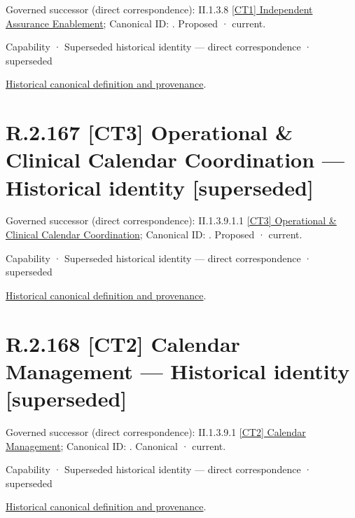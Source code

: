 {\small Governed successor (direct correspondence): II.1.3.8 \hyperref[element:616682b612d244429e656b040e002d56]{[CT1] Independent Assurance Enablement}; Canonical ID: \texttt{}. Proposed · current.}\par
\label{element:88bf57b7a92c4c1da1b5f0a67d3ebd82}
{\small Capability · Superseded historical identity — direct correspondence · superseded}\par
\href{../../../../../../../continuum/strategy/capability/88bf57b7a92c4c1da1b5f0a67d3ebd82.md}{Historical canonical definition and provenance}.\par
\section*{R.2.167 [CT3] Operational \& Clinical Calendar Coordination — Historical identity [superseded]}
\label{navigation:R.2.167}

{\small Governed successor (direct correspondence): II.1.3.9.1.1 \hyperref[element:f6d8f1310ba543f69e8b57bf05603db3]{[CT3] Operational \& Clinical Calendar Coordination}; Canonical ID: \texttt{}. Proposed · current.}\par
\label{element:c0f6e5f7f5a94d1580fa6e0e8b82c93a}
{\small Capability · Superseded historical identity — direct correspondence · superseded}\par
\href{../../../../../../../continuum/strategy/capability/c0f6e5f7f5a94d1580fa6e0e8b82c93a.md}{Historical canonical definition and provenance}.\par
\section*{R.2.168 [CT2] Calendar Management — Historical identity [superseded]}
\label{navigation:R.2.168}

{\small Governed successor (direct correspondence): II.1.3.9.1 \hyperref[element:7669036f7e6749219412fc64df5f7064]{[CT2] Calendar Management}; Canonical ID: \texttt{}. Canonical · current.}\par
\label{element:8b42aac6083441caa78b59f5e62eebd9}
{\small Capability · Superseded historical identity — direct correspondence · superseded}\par
\href{../../../../../../../continuum/strategy/capability/8b42aac6083441caa78b59f5e62eebd9.md}{Historical canonical definition and provenance}.\par
